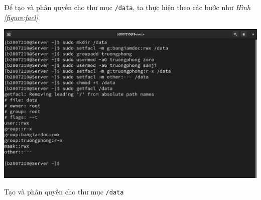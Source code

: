 \documentclass[a4paper, 11pt]{article}
\begin{document}
Để tạo và phân quyền cho thư mục \texttt{/data}, ta thực hiện theo các bước như \textit{Hình \ref{figure:facl}}.

\begin{minipage}
    {\linewidth}
    \captionsetup{type=figure}
    \centering
    \includegraphics[width=\linewidth]{images/facl.png}
    \caption{Tạo và phân quyền cho thư mục \texttt{/data}}
    \label{figure:facl}
\end{minipage}
\end{document}
